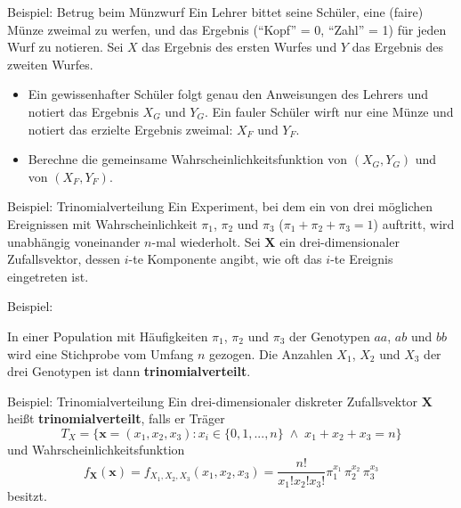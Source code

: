 \documentclass[
  10pt,
  ignorenonframetext,
]{beamer}
\providecommand{\tightlist}{%
  \setlength{\itemsep}{0pt}\setlength{\parskip}{0pt}}
\begin{document}
\begin{frame}{Beispiel: Betrug beim Münzwurf}
\label{beispiel-betrug-beim-muxfcnzwurf}
Ein Lehrer bittet seine Schüler, eine (faire) Münze zweimal zu werfen,
und das Ergebnis (``Kopf'' = 0, ``Zahl'' = 1) für jeden Wurf zu
notieren. Sei \(X\) das Ergebnis des ersten Wurfes und \(Y\) das
Ergebnis des zweiten Wurfes.

\begin{itemize}
\tightlist
\item
  Ein gewissenhafter Schüler folgt genau den Anweisungen des Lehrers und
  notiert das Ergebnis \(X_G\) und \(Y_G\). Ein fauler Schüler wirft nur
  eine Münze und notiert das erzielte Ergebnis zweimal: \(X_F\) und
  \(Y_F\).\\
\item
  Berechne die gemeinsame Wahrscheinlichkeitsfunktion von \((X_G, Y_G)\)
  und von \((X_F, Y_F)\).
\end{itemize}

\end{frame}

\begin{frame}{Beispiel: Trinomialverteilung}
\label{beispiel-trinomialverteilung}
Ein Experiment, bei dem ein von drei möglichen Ereignissen mit
Wahrscheinlichkeit \(\pi_1\), \(\pi_2\) und \(\pi_3\)
(\(\pi_1+\pi_2+\pi_3=1\)) auftritt, wird unabhängig voneinander
\(n\)-mal wiederholt. Sei \(\symbf{X}\) ein drei-dimensionaler
Zufallsvektor, dessen \(i\)-te Komponente angibt, wie oft das \(i\)-te
Ereignis eingetreten ist.

Beispiel:

In einer Population mit Häufigkeiten \(\pi_1\), \(\pi_2\) und \(\pi_3\)
der Genotypen \(aa\), \(ab\) und \(bb\) wird eine Stichprobe vom Umfang
\(n\) gezogen. Die Anzahlen \(X_1\), \(X_2\) und \(X_3\) der drei
Genotypen ist dann \textbf{trinomialverteilt}.
\end{frame}

\begin{frame}{Beispiel: Trinomialverteilung}
\label{beispiel-trinomialverteilung-1}
Ein drei-dimensionaler diskreter Zufallsvektor \(\symbf{X}\) heißt
\textbf{trinomialverteilt}, falls er Träger
\[T_X = \{ \symbf{x}=(x_1,x_2,x_3): x_i \in \{0,1,..., n\} \;\land\;
x_1+x_2+x_3=n\}\] und Wahrscheinlichkeitsfunktion \[
f_{\symbf{X}}(\symbf{x}) = f_{X_1, X_2, X_3}(x_1, x_2, x_3) = \frac{n!}{x_1!x_2!x_3!}
\pi_1^{x_1} \, \pi_2^{x_2} \, \pi_3^{x_3}
\] besitzt.\\
\strut ~
\end{frame}
\end{document}
